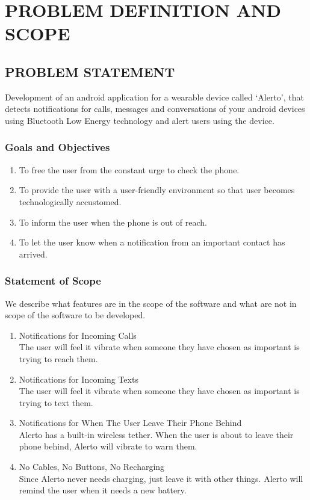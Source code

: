 \documentclass[12pt,a4paper]{report}
\begin{document}
\chapter{PROBLEM DEFINITION AND SCOPE}
\newpage
\section{PROBLEM STATEMENT}
Development  of  an  android  application  for  a  wearable device  called  ‘Alerto’,  that  detects  notifications  for  calls,  messages  and conversations  of  your  android  devices  using  Bluetooth  Low Energy technology and alert users using the device.

\subsection{Goals and Objectives}
\begin{enumerate}
	\item To free the user from the constant urge to check the phone.
	\item To provide the user with a user-friendly environment so that user becomes technologically accustomed.
	\item To inform the user when the phone is out of reach.
	\item To let the user know  when a notification from an important contact has arrived.
\end{enumerate}

\subsection{Statement of Scope}
We describe what features are in the scope of the software and what are not in scope of the software to be developed.
\begin{enumerate}
	\item	Notifications for Incoming Calls \\
	The user will feel it vibrate when someone they have chosen as important is trying to reach them.
	\item	Notifications for Incoming Texts \\
	 The user will feel it vibrate when someone they have chosen as important is trying to text them.
	\item	Notifications for When The User Leave Their Phone Behind \\
	Alerto has a built-in wireless tether. When the user is about to leave their phone behind, Alerto will vibrate to warn them.
	\item	No Cables, No Buttons, No Recharging \\
	Since Alerto never needs charging, just leave it with other things. Alerto will remind the user when it needs a new battery.
\end{enumerate}
\end{document}
